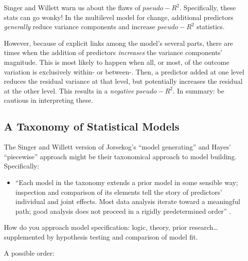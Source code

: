 \documentclass[
  english,
]{book}
\providecommand{\tightlist}{%
  \setlength{\itemsep}{0pt}\setlength{\parskip}{0pt}}
\begin{document}
Singer and Willett \citeyearpar{singer_applied_2003} warn us about the flaws of \(pseudo-R^2\). Specifically, these stats can go wonky! In the multilevel model for change, additional predictors \emph{generally} reduce variance components and increase \(pseudo-R^2\) statistics.

However, because of explicit links among the model's several parts, there are times when the addition of predictors \emph{increases} the variance components' magnitude. This is most likely to happen when all, or most, of the outcome variation is exclusively within- or between-. Then, a predictor added at one level reduces the residual variance at that level, but potentially increases the residual at the other level. This results in a \emph{negative} \(pseudo-R^2\). In summary: be cautious in interpreting these.

\hypertarget{a-taxonomy-of-statistical-models}{%
\subsection{A Taxonomy of Statistical Models}\label{a-taxonomy-of-statistical-models}}

The Singer and Willett \citeyearpar{singer_applied_2003} version of Jorsekog's \citeyearpar{bollen_testing_1993} ``model generating'' and Hayes' \citeyearpar{hayes_introduction_2018} ``piecewise'' approach might be their taxonomical approach to model building. Specifically:

\begin{itemize}
\tightlist
\item
  ``Each model in the taxonomy extends a prior model in some sensible way; inspection and comparison of its elements tell the story of predictors' individual and joint effects. Most data analysis iterate toward a meaningful path; good analysis does not proceed in a rigidly predetermined order'' \citep[p.~105]{singer_applied_2003}.
\end{itemize}

How do you approach model specification: logic, theory, prior research\ldots supplemented by hypothesis testing and comparison of model fit.

A possible order:
\end{document}

